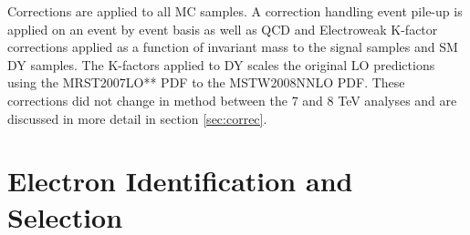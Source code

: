 
	Corrections are applied to all MC samples. A correction handling event pile-up is applied on an event by event basis as well as QCD and Electroweak K-factor corrections applied as a function of invariant mass to the signal samples and SM DY samples. The K-factors applied to DY scales the original LO predictions using the MRST2007LO** \cite{} PDF to the MSTW2008NNLO \cite{} PDF. These corrections did not change in method between the 7 and 8 TeV analyses and are discussed in more detail in section \ref{sec:correc}.



\section{Electron Identification and Selection}

